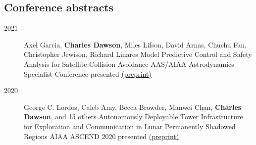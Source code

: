 \documentclass{cv_style}
\newcommand{\me}{\textbf{Charles Dawson}}
\begin{document}
    \subsection{Conference abstracts}
        \begin{description}
            \item[2021 $\vert$]
                    {Axel Garcia, \me, Miles Lifson, David Arnas, Chuchu Fan, Christopher Jewison, Richard Linares}
                    {Model Predictive Control and Safety Analysis for Satellite Collision Avoidance}
                    {AAS/AIAA Astrodynamics Specialist Conference}
                    {presented}
                    {
                        \href{https://www.researchgate.net/publication/353804229_Model_Predictive_Control_and_Safety_Analysis_for_Satellite_Collision_Avoidance_AAS_21-662}{(preprint)}
                    }
            \item[2020 $\vert$]
                    {George C. Lordos, Caleb Amy, Becca Browder, Manwei Chan, \me, and 15 others}
                    {Autonomously Deployable Tower Infrastructure for Exploration and Communication in Lunar Permanently Shadowed Regions}
                    {AIAA ASCEND 2020}
                    {presented}
                    {
                        \href{https://arc.aiaa.org/doi/abs/10.2514/6.2020-4109}{(preprint)}
                    }
        \end{description}


\end{document}
